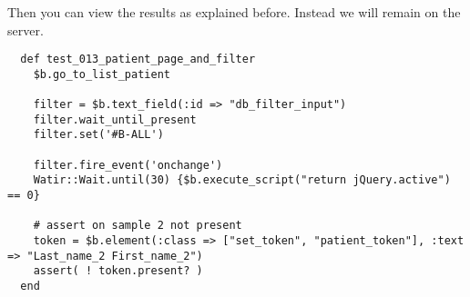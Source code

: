 Then you can view the results as explained before.
Instead we will remain on the server.

\begin{verbatim}
  def test_013_patient_page_and_filter
    $b.go_to_list_patient

    filter = $b.text_field(:id => "db_filter_input")
    filter.wait_until_present
    filter.set('#B-ALL')

    filter.fire_event('onchange')
    Watir::Wait.until(30) {$b.execute_script("return jQuery.active") == 0}

    # assert on sample 2 not present
    token = $b.element(:class => ["set_token", "patient_token"], :text => "Last_name_2 First_name_2")
    assert( ! token.present? )
  end

\end{verbatim}

